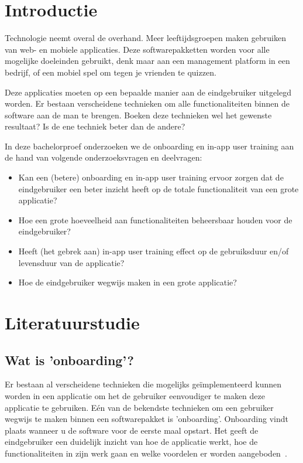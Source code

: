 
\section{Introductie} %
\label{sec:introductie}

Technologie neemt overal de overhand. Meer leeftijdsgroepen maken gebruiken van web- en mobiele applicaties. Deze softwarepakketten worden voor alle mogelijke doeleinden gebruikt, denk maar aan een management platform in een bedrijf, of een mobiel spel om tegen je vrienden te quizzen.

Deze applicaties moeten op een bepaalde manier aan de eindgebruiker uitgelegd worden. Er bestaan verscheidene technieken om alle functionaliteiten binnen de software aan de man te brengen. Boeken deze technieken wel het gewenste resultaat? Is de ene techniek beter dan de andere?

In deze bachelorproef onderzoeken we de onboarding en in-app user training aan de hand van volgende onderzoeksvragen en deelvragen:

\begin{itemize}
    \item Kan een (betere) onboarding en in-app user training ervoor zorgen dat de eindgebruiker een beter inzicht heeft op de totale functionaliteit van een grote applicatie?
    \item Hoe een grote hoeveelheid aan functionaliteiten beheersbaar houden voor de eindgebruiker?
    \item Heeft (het gebrek aan) in-app user training effect op de gebruiksduur en/of levensduur van de applicatie?
    \item Hoe de eindgebruiker wegwijs maken in een grote applicatie?
\end{itemize}


\section{Literatuurstudie}
\label{sec:state-of-the-art}

\subsection{Wat is 'onboarding'?}
Er bestaan al verscheidene technieken die mogelijks geïmplementeerd kunnen worden in een applicatie om het de gebruiker eenvoudiger te maken deze applicatie te gebruiken. Eén van de bekendste technieken om een gebruiker wegwijs te maken binnen een softwarepakket is 'onboarding'. Onboarding vindt plaats wanneer u de software voor de eerste maal opstart. Het geeft de eindgebruiker een duidelijk inzicht van hoe de applicatie werkt, hoe de functionaliteiten in zijn werk gaan en welke voordelen er worden aangeboden~\autocite{Cardoso2017}.

